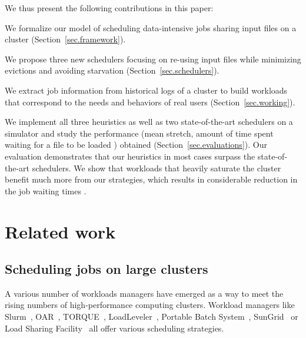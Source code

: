 \documentclass[conference]{IEEEtran}
\newcommand{\rev}[1]{{\color{black}{#1}}}
\begin{document}
We thus present the following contributions in this paper:
\begin{compactenum}
	\item We formalize our model of scheduling data-intensive jobs sharing input files on a cluster (Section~\ref{sec.framework}).
	\item We propose three new schedulers focusing on re-using input files while minimizing evictions and avoiding starvation (Section~\ref{sec.schedulers}).
	\item We extract job information from historical logs of a cluster to build workloads that correspond to the needs and behaviors of real users (Section~\ref{sec.working}).
	\item We implement all three heuristics as well as two state-of-the-art schedulers on a simulator and study the performance (mean stretch, amount of time spent waiting for a file to be loaded \rev{and number of core hours}) obtained \rev{after scheduling almost 2 millions jobs} (Section~\ref{sec.evaluations}).
	Our evaluation demonstrates that our heuristics in most cases surpass the state-of-the-art schedulers.
	We show that workloads that heavily saturate the cluster
    benefit much more from our strategies, which results in
    considerable reduction in the job waiting times \rev{as well as the total core hours}.
\end{compactenum}
\rev{We used simulations to avoid disrupting users on a production
cluster, but our strategies could be implemented on the Slurm workload
by asking the users to flag the input files they are using.}

\section{Related work}\label{sec.related_work}

\subsection{Scheduling jobs on large clusters}

A various number of workloads managers have emerged 
as a way to meet the rising numbers of high-performance computing clusters.
Workload managers like Slurm~\cite{SLURM}, OAR~\cite{oar},
TORQUE~\cite{torque}, LoadLeveler~\cite{loadleveler},
Portable Batch System~\cite{pbs}, SunGrid~\cite{sungrid}
or Load Sharing Facility~\cite{lsf} all offer
various scheduling strategies.
\end{document}
